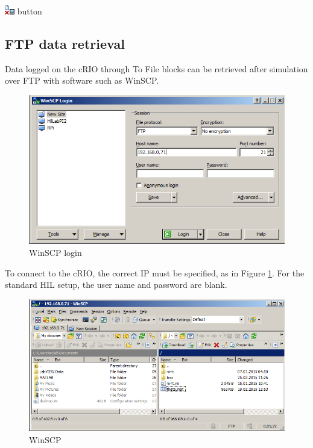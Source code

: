 \documentclass[a4paper,twoside,english]{report}
\begin{document}
\includegraphics[scale=0.8]{fig/veristand_undeploy} button

\subsection{FTP data retrieval}

Data logged on the cRIO through To File blocks can be retrieved after
simulation over FTP with software such as WinSCP.

\begin{figure}[h]
\centering \includegraphics[scale=0.45]{fig/WinSCP_login} \caption{\label{fig: WinSCP login}WinSCP login}
\end{figure}

To connect to the cRIO, the correct IP must be specified, as in Figure
\ref{fig: WinSCP login}. For the standard HIL setup, the user name
and password are blank.

\begin{figure}[h]
\centering \includegraphics[scale=0.45]{fig/WinSCP} \caption{\label{fig: WinSCP}WinSCP}
\end{figure}
\end{document}
